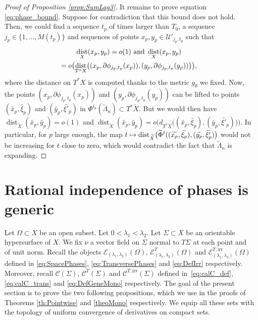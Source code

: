 \documentclass[JEP,XML,SOM,Unicode,published]{cedram}
\let\mathcal\mathscr
\newcommand\mto{\mathchoice{\longmapsto}{\mapsto}{\mapsto}{\mapsto}}
\newcommand{\irr}{\mathrm{irr}}
\DeclareMathOperator{\dist}{dist}
\theoremstyle{plain}
\theoremstyle{definition}
\def\calC{\mathcal{C}}
\begin{document}
\begin{proof}[Proof of Proposition \ref{prop:SumLag3}]
It remains to prove equation \eqref{eq:phase_bound}. Suppose for contradiction that this bound does not hold. Then, we could find a sequence $t_p$ of times larger than $T_0$, a sequence $j_p\in \{1,\dots, M(t_p)\}$ and sequences of points $x_p, y_p\in \mathcal{U}'_{j_p, t_p}$ such that
\begin{multline*}
\dist_{X}(x_p,y_p)=o(1)\textup{ and }\dist_{X}(x_p,y_p)\\
= o\bigl(\dist_{T^*X} \bigl((x_p,\partial \phi_{j_p,t_p}(x_p)), (y_p, \partial \phi_{j_p,t_p}(y_p)) \bigr) \bigr),
\end{multline*}
where the distance on $T^*X$ is computed thanks to the metric $g_0$ we fixed. Now, the points $(x_p, \partial \phi_{j_p,t_p}(x_p))$ and $(y_p, \partial \phi_{j_p,t_p}(y_p))$ can be lifted to points $(\widetilde{x_p}, \widetilde{\xi_p})$ and $(\widetilde{y_p}, \widetilde{\xi'_p})$ in $\Phi^{t_p}(\widetilde{\Lambda}_n)\subset T^*\widetilde{X}$. But we would then have $\dist_{\widetilde{X}}(\widetilde{x_p},\widetilde{y_p})=o(1)$ and
$\dist_{\widetilde{X}}(\widetilde{x_p},\widetilde{y_p})=o \bigl(d_{T^*\widetilde{X}} \bigl((\widetilde{x_p}, \widetilde{\xi_p}), (\widetilde{y_p}, \widetilde{\xi'_p})\bigr)\bigr)$. In particular, for $p$ large enough, the map $t\mto \dist_{\widetilde{X}}\bigl(\widetilde{\Phi}^{t}((\widetilde{x_p}, \widetilde{\xi_p}),(\widetilde{y_p}, \widetilde{\xi'_p})\bigr)$ would not be increasing for $t$ close to zero, which would contradict the fact that $\widetilde{\Lambda}_n$ is expanding.
\end{proof}

\section{Rational independence of phases is generic}\label{sec:PhaseGen}

Let $\Omega\subset X$ be an open subset. Let $0<\lambda_1<\lambda_2$. Let $\Sigma\subset X$ be an orientable hypersurface of $X$. We fix $\nu$ a vector field on $\Sigma$ normal to $T\Sigma$ at each point and of unit norm. Recall the objects $\mathcal{E}_{(\lambda_1,\lambda_2)}(\Omega)$, $\mathcal{E}^T_{(\lambda_1,\lambda_2)}(\Omega)$ and $\mathcal{E}^{T,\irr}_{(\lambda_1,\lambda_2)}(\Omega)$ defined in \eqref{eq:SpacePhases}, \eqref{eq:TransversePhases} and \eqref{eq:DefIrr} respectively. Moreover, recall $\calC(\Sigma)$, $\calC^T(\Sigma)$ and $\mathcal{C}^{T,\irr}(\Sigma)$ defined in~\eqref{eq:calC_def}, \eqref{eq:calC_trans} and \eqref{eq:DefGeneMono} respectively. The goal of the present section is to prove the two following propositions, which we use in the proofs of Theorems \ref{th:Pointwise} and \ref{theoMono} respectively. We equip all these sets with the topology of uniform convergence of derivatives on compact sets.
\end{document}
